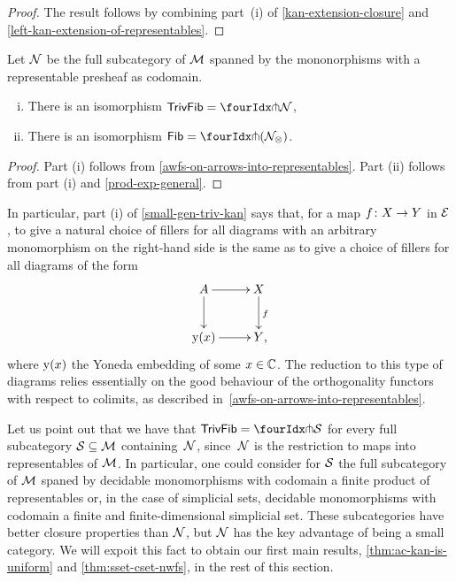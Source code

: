 \documentclass[reqno,10pt,a4paper,oneside,draft]{amsart}
\begin{document}
\begin{proof}
The result follows by combining part~(i) of \cref{kan-extension-closure} and \cref{left-kan-extension-of-representables}.
\end{proof}

\begin{theorem} \label{small-gen-triv-kan} Let $\cal{N}$ be the full subcategory of $\cal{M}$ spanned by the mononorphisms with a representable presheaf as codomain.
\begin{enumerate}[(i)]
\item There is an isomorphism $\TrivFib = \liftr{\cal{N}}$,
\item There is an isomorphism $\Fib = \liftr{(\cal{N}_\otimes)}$.
\end{enumerate}
\end{theorem}

\begin{proof} Part (i) follows from \cref{awfs-on-arrows-into-representables}.
Part (ii) follows from part (i) and \cref{prod-exp-general}.
\end{proof}

In particular, part (i) of \cref{small-gen-triv-kan} says that, for a map $f \co X \to Y$ in $\catE$, to give a natural choice of fillers for all diagrams with an arbitrary monomorphism on the right-hand side is the same as to give a choice of fillers for all diagrams of the form
\[
\xymatrix{
A \ar[r] \ar[d] & X \ar[d]^f \\
\yon(x) \ar[r] & Y \rlap{,} }
\]
where $\yon(x)$ the Yoneda embedding of some $x \in \catC$.
The reduction to this type of diagrams relies essentially on the good behaviour of the orthogonality functors with respect to colimits, as described in~\cref{awfs-on-arrows-into-representables}.

\medskip

Let us point out that we have that $\TrivFib = \liftr{\cal{S}}$ for every full subcategory $\cal{S} \subseteq \cal{M}$ containing~$\cal{N}$, since~$\cal{N}$ is the restriction to maps into representables of $\cal{M}$.
In particular, one could consider for
$\cal{S}$ the full subcategory of $\cal{M}$ spaned by decidable monomorphisms with codomain a finite product of representables or, in the case of simplicial sets, decidable monomorphisms with codomain a finite and finite-dimensional simplicial set.
These subcategories have better closure properties than $\cal{N}$, but $\cal{N}$ has the key advantage of being a small category.
We will expoit this fact to obtain our first main results, \cref{thm:ac-kan-is-uniform} and \cref{thm:sset-cset-nwfs}, in the rest of this section.
\end{document}
